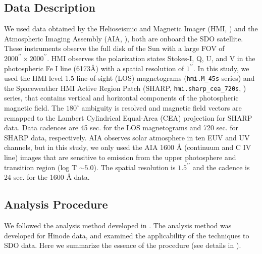 \documentclass[10pt,preprint2]{aastex}
\begin{document}
\subsection{Data Description} \label{sec:data}

We used data obtained by the Helioseismic and Magnetic Imager (HMI, \citet{schou12}) and the Atmospheric Imaging Assembly (AIA, \citet{lemen12}), both are onboard the SDO satellite.
These instruments observe the full disk of the Sun with a large FOV of $2000^{\prime\prime} \times 2000^{\prime\prime}$.
HMI observes the polarization states Stokes-I, Q, U, and V in the photospheric Fe I line (6173{\AA}) with a spatial resolution of $1^{\prime\prime}$.
In this study, we used the HMI level 1.5 line-of-sight (LOS) magnetograms ({\tt hmi.M\_45s} series) and the Spaceweather HMI Active Region Patch (SHARP, {\tt hmi.sharp\_cea\_720s}, \citet{bobra14}) series, that contains vertical and horizontal components of the photospheric magnetic field.
The $180^{\circ}$ ambiguity is resolved and magnetic field vectors are remapped to the Lambert Cylindrical Equal-Area (CEA) projection for SHARP data.
Data cadences are 45 sec. for the LOS magnetograms and 720 sec. for SHARP data, respectively.
AIA observes solar atmosphere in ten EUV and UV channels, but in this study, we only used the AIA 1600 {\AA} (continuum and C IV line) images that are sensitive to emission from the upper photosphere and transition region (log T $\sim 5.0$).
The spatial resolution is $1.5^{\prime\prime}$ and the cadence is 24 sec. for the 1600 {\AA} data.

\subsection{Analysis Procedure} \label{sec:method}

We followed the analysis method developed in \citet{bamba13}.
The analysis method was developed for Hinode data, and \citet{bamba14} examined the applicability of the techniques to SDO data.
Here we summarize the essence of the procedure (see details in \citet{bamba13, bamba14}).
\end{document}
